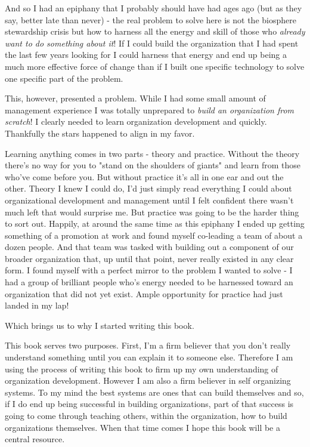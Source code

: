 \documentclass[11pt,a5paper]{book}
\begin{document}
And so I had an epiphany that I probably should have had ages ago (but as they say, better late than never) - the real problem to solve here is not the biosphere stewardship crisis but how to harness all the energy and skill of those who \textit{already want to do something about it}! If I could build the organization that I had spent the last few years looking for I could harness that energy and end up being a much more effective force of change than if I built one specific technology to solve one specific part of the problem. 
\newline

This, however, presented a problem. While I had some small amount of management experience I was totally unprepared to \textit{build an organization from scratch}! I clearly needed to learn organization development and quickly. Thankfully the stars happened to align in my favor.
\newline

Learning anything comes in two parts - theory and practice. Without the theory there's no way for you to "stand on the shoulders of giants" and learn from those who've come before you. But without practice it's all in one ear and out the other. Theory I knew I could do, I'd just simply read everything I could about organizational development and management until I felt confident there wasn't much left that would surprise me. But practice was going to be the harder thing to sort out. Happily, at around the same time as this epiphany I ended up getting something of a promotion at work and found myself co-leading a team of about a dozen people. And that team was tasked with building out a component of our broader organization that, up until that point, never really existed in any clear form. I found myself with a perfect mirror to the problem I wanted to solve - I had a group of brilliant people who's energy needed to be harnessed toward an organization that did not yet exist. Ample opportunity for practice had just landed in my lap!
\newline

Which brings us to why I started writing this book.
\newline

This book serves two purposes. First, I'm a firm believer that you don't really understand something until you can explain it to someone else. Therefore I am using the process of writing this book to firm up my own understanding of organization development. However I am also a firm believer in self organizing systems. To my mind the best systems are ones that can build themselves and so, if I do end up being successful in building organizations, part of that success is going to come through teaching others, within the organization, how to build organizations themselves. When that time comes I hope this book will be a central resource.
\newline
\end{document}
